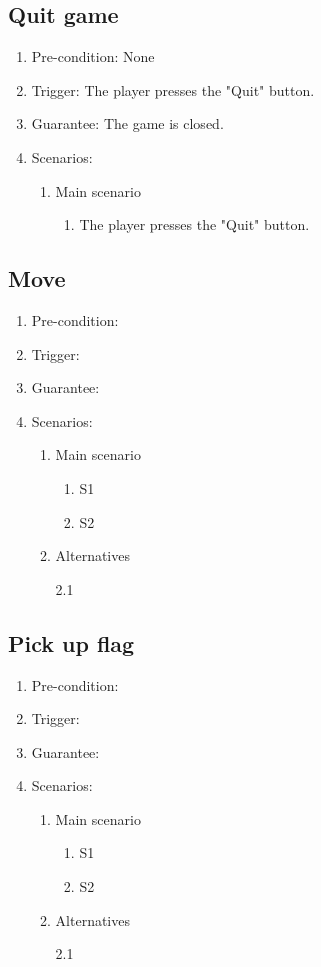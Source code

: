 \documentclass[a4paper,twoside,11pt]{article}
\begin{document}
\subsection*{Quit game}
\begin{enumerate}
\item Pre-condition: None
\item Trigger: The player presses the "Quit" button.
\item Guarantee: The game is closed.
\item Scenarios: 
	\begin{enumerate}
	\item Main scenario
		\begin{enumerate}[1)]
		\item The player presses the "Quit" button.
		\end{enumerate}
	\end{enumerate}
\end{enumerate}
\subsection*{Move}
\begin{enumerate}
\item Pre-condition: 
\item Trigger:
\item Guarantee:
\item Scenarios: 
	\begin{enumerate}
	\item Main scenario
		\begin{enumerate}[1)]
		\item S1
		\item S2
		\end{enumerate}
	\item Alternatives
		\begin{description}
		\item[2.1]
		\end{description}
	\end{enumerate}
\end{enumerate}
\subsection*{Pick up flag}
\begin{enumerate}
\item Pre-condition: 
\item Trigger:
\item Guarantee:
\item Scenarios: 
	\begin{enumerate}
	\item Main scenario
		\begin{enumerate}[1)]
		\item S1
		\item S2
		\end{enumerate}
	\item Alternatives
		\begin{description}
		\item[2.1]
		\end{description}
	\end{enumerate}
\end{enumerate}
\end{document}
